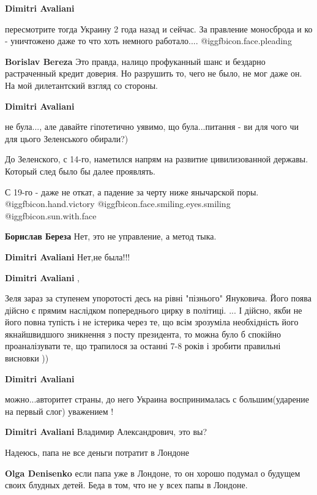 \begin{itemize}
\begin{itemize}
\textbf{Dimitri Avaliani} 

пересмотрите тогда Украину 2 года назад и сейчас. За правление моносброда и ко
- уничтожено даже то что хоть немного работало.... @igg{fbicon.face.pleading} 

\textbf{Borislav Bereza} Это правда, налицо профуканный шанс и бездарно растраченный кредит доверия. Но разрушить то, чего не было, не мог даже он. На мой дилетантский взгляд со стороны.

\textbf{Dimitri Avaliani} 

не була..., але давайте гіпотетично уявимо, що була...питання - ви для чого чи
для цього Зеленського обирали?)


До Зеленского, с 14-го, наметился напрям на развитие цивилизованной державы.
Который след было бы далее проявлять.

С 19-го - даже не откат, а падение за черту ниже янычарской поры. @igg{fbicon.hand.victory}
@igg{fbicon.face.smiling.eyes.smiling}  @igg{fbicon.sun.with.face} 


\textbf{Борислав Береза} Нет, это не управление, а метод тыка.

\textbf{Dimitri Avaliani} Нет,не была!!!

\textbf{Dimitri Avaliani} , 

Зеля зараз за ступенем упоротості десь на рівні "пізнього" Януковича. Його
поява дійсно є прямим наслідком попереднього цирку в політиці. ... І дійсно,
якби не його повна тупість і не істерика через те, що всім зрозуміла
необхідність його якнайшвидшого зникнення з посту президента, то можна було б
спокійно проаналізувати те, що трапилося за останні 7-8 років і зробити
правильні висновки ))


\textbf{Dimitri Avaliani} 

можно...авторитет страны, до него Украина воспринималась с большим(ударение на
первый слог) уважением !


\textbf{Dimitri Avaliani} Владимир Александрович, это вы?
\end{itemize} %

Надеюсь, папа не все деньги потратит в Лондоне

\begin{itemize} %
\textbf{Olga Denisenko} если папа уже в Лондоне, то он хорошо подумал о будущем своих блудных детей. Беда в том, что не у всех папы в Лондоне.
\end{itemize} %


\end{itemize}
